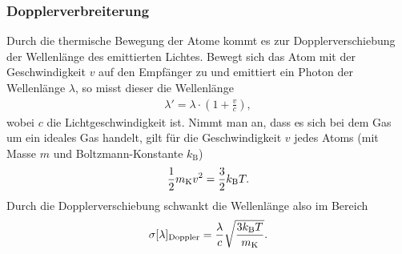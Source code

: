 \subsubsection{Dopplerverbreiterung}
Durch die thermische Bewegung der Atome kommt es zur Dopplerverschiebung der Wellenlänge des emittierten Lichtes. Bewegt sich das Atom mit der Geschwindigkeit $v$ auf den Empfänger zu und emittiert ein Photon der Wellenlänge $\lambda$, so misst dieser die Wellenlänge 
\begin{align*}
  \lambda'=\lambda \cdot \left(  1+ \frac{v}{c} \right),
\end{align*} 
wobei $c$ die Lichtgeschwindigkeit ist. Nimmt man an, dass es sich bei dem Gas um ein ideales Gas handelt, gilt für die Geschwindigkeit $v$ jedes Atoms (mit Masse $m$ und Boltzmann-Konstante $k_\mathrm{B}$)
\begin{align*}
  \frac{1}{2} m_\mathrm{K} v^2=\frac{3}{2} k_\mathrm{B} T.
\end{align*}
Durch die Dopplerverschiebung schwankt die Wellenlänge also im Bereich
\begin{align}
  \sigma[\lambda]_\mathrm{Doppler}=\frac{\lambda}{c}\sqrt{\frac{3k_\mathrm{B}T}{m_\mathrm{K}}}.
  \label{equ:doppler}
\end{align}